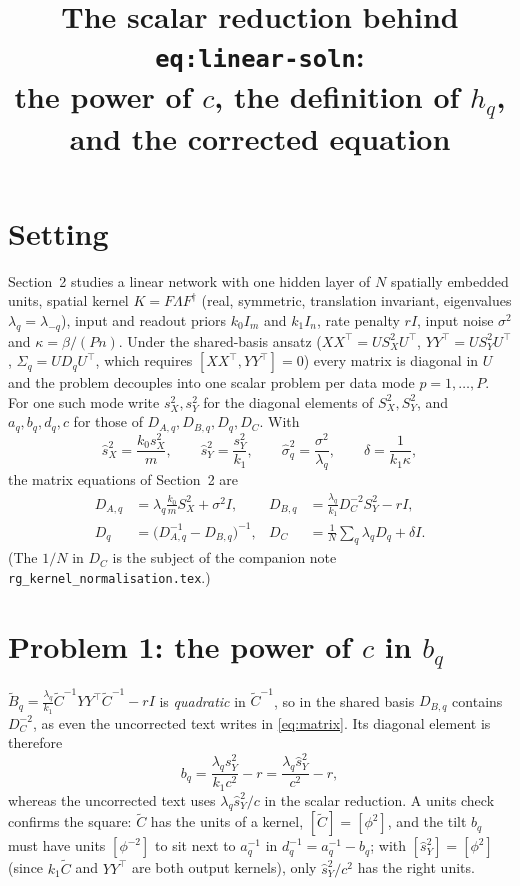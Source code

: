 \documentclass[11pt,a4paper]{article}
\title{The scalar reduction behind \texttt{eq:linear-soln}:\\the power of $c$, the definition of $h_q$, and the corrected equation}
\author{}
\date{}
\begin{document}
\maketitle

\section{Setting}
Section~2 studies a linear network with one hidden layer of $N$ spatially embedded units, spatial kernel $K = F\Lambda F^\dagger$ (real, symmetric, translation invariant, eigenvalues $\lambda_q = \lambda_{-q}$), input and readout priors $k_0 I_m$ and $k_1 I_n$, rate penalty $r I$, input noise $\sigma^2$ and $\kappa = \beta/(Pn)$.
Under the shared-basis ansatz ($XX^\top = U S_X^2 U^\top$, $YY^\top = U S_Y^2 U^\top$, $\Sigma_q = U D_q U^\top$, which requires $[XX^\top, YY^\top] = 0$) every matrix is diagonal in $U$ and the problem decouples into one scalar problem per data mode $p = 1,\dots,P$.
For one such mode write $s_X^2, s_Y^2$ for the diagonal elements of $S_X^2, S_Y^2$, and $a_q, b_q, d_q, c$ for those of $D_{A,q}, D_{B,q}, D_q, D_C$. With
\begin{equation}
  \hat s_X^2 = \frac{k_0 s_X^2}{m}, \qquad \hat s_Y^2 = \frac{s_Y^2}{k_1}, \qquad \hat\sigma_q^2 = \frac{\sigma^2}{\lambda_q}, \qquad \delta = \frac{1}{k_1\kappa},
\end{equation}
the matrix equations of Section~2 are
\begin{equation}
\begin{aligned}
  D_{A,q} &= \lambda_q\tfrac{k_0}{m}S_X^2 + \sigma^2 I, &
  D_{B,q} &= \frac{\lambda_q}{k_1}D_C^{-2}S_Y^2 - r I,\\
  D_q &= \big(D_{A,q}^{-1} - D_{B,q}\big)^{-1}, &
  D_C &= \frac1N\sum_q\lambda_q D_q + \delta I .
\end{aligned}
  \label{eq:matrix}
\end{equation}
(The $1/N$ in $D_C$ is the subject of the companion note \texttt{rg\_kernel\_normalisation.tex}.)

\section{\texorpdfstring{Problem 1: the power of $c$ in $b_q$}{Problem 1: the power of c in b\_q}}
$\tilde B_q = \frac{\lambda_q}{k_1}\tilde C^{-1}YY^\top\tilde C^{-1} - r I$ is \emph{quadratic} in $\tilde C^{-1}$, so in the shared basis $D_{B,q}$ contains $D_C^{-2}$, as even the uncorrected text writes in \eqref{eq:matrix}. Its diagonal element is therefore
\begin{equation}
  b_q = \frac{\lambda_q s_Y^2}{k_1 c^2} - r = \frac{\lambda_q\hat s_Y^2}{c^2} - r ,
\end{equation}
whereas the uncorrected text uses $\lambda_q\hat s_Y^2/c$ in the scalar reduction.
A units check confirms the square: $\tilde C$ has the units of a kernel, $[\tilde C] = [\phi^2]$, and the tilt $b_q$ must have units $[\phi^{-2}]$ to sit next to $a_q^{-1}$ in $d_q^{-1} = a_q^{-1} - b_q$; with $[\hat s_Y^2] = [\phi^2]$ (since $k_1\tilde C$ and $YY^\top$ are both output kernels), only $\hat s_Y^2/c^2$ has the right units.
\end{document}

